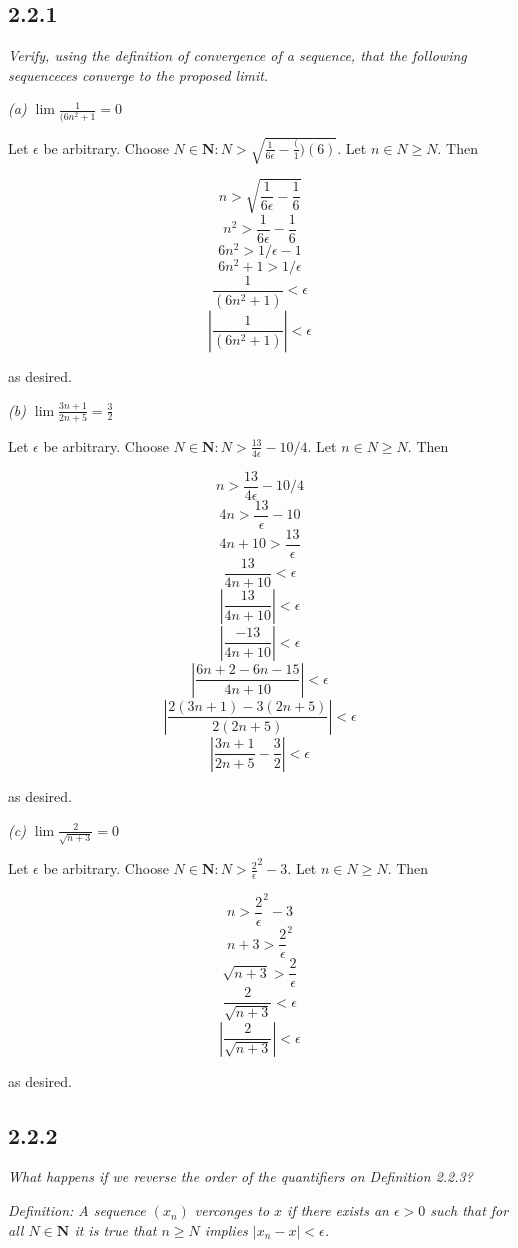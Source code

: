 \documentclass[11pt,oneside,titlepage]{book}
\begin{document}
\subsection*{2.2.1}
\textit{Verify, using the definition of convergence of a sequence, that the following
  sequenceces converge to the proposed limit.}

\textit{(a) $\lim\frac{1}{(6 n ^ 2 + 1} = 0$}

Let $\epsilon$ be arbitrary. Choose
$N \in \textbf{N}: N > \sqrt{\frac{1}{6 \epsilon} - \frac(1)(6)}$. Let $n \in N \geq N$. Then

$$n > \sqrt{\frac{1}{6 \epsilon} - \frac{1}{6}}$$
$$n ^ 2  > \frac{1}{6 \epsilon} - \frac{1}{6}$$
$$6 n ^ 2  > 1/\epsilon - 1$$
$$6 n ^ 2 + 1 > 1/\epsilon$$
$$\frac{1}{(6 n ^ 2 + 1)} < \epsilon$$
$$|\frac{1}{(6 n ^ 2 + 1)}| < \epsilon$$

as desired.

\textit{(b) $\lim\frac{3n + 1}{2n + 5} = \frac{3}{2}$}

Let $\epsilon$ be arbitrary. Choose
$N \in \textbf{N}: N > \frac{13}{4 \epsilon} - 10/4$. Let $n \in N \geq N$. Then

$$ n > \frac{13}{4 \epsilon} - 10/4$$
$$ 4n > \frac{13}{\epsilon} - 10$$
$$ 4n + 10 > \frac{13}{\epsilon} $$
$$ \frac{13}{4n + 10} < \epsilon $$
$$ |\frac{13}{4n + 10}| < \epsilon $$
$$ |\frac{-13}{4n + 10}| < \epsilon $$
$$ |\frac{6n + 2 - 6n - 15}{4n + 10}| < \epsilon $$
$$ |\frac{2(3n + 1) - 3(2n + 5)}{2(2n + 5)}| < \epsilon $$
$$ |\frac{3n + 1}{2n + 5} - \frac{3}{2}| < \epsilon $$

as desired.

\textit{(c) $\lim\frac{2}{\sqrt{n + 3}} = 0$}

Let $\epsilon$ be arbitrary. Choose
$N \in \textbf{N}: N > {\frac{2}{\epsilon}}^2 - 3$. Let $n \in N \geq N$. Then

$$n> {\frac{2}{\epsilon}}^2 - 3$$
$$n + 3 > {\frac{2}{\epsilon}}^2$$
$$\sqrt{n + 3} > \frac{2}{\epsilon}$$
$$\frac{2}{\sqrt{n + 3}} < \epsilon$$
$$|\frac{2}{\sqrt{n + 3}}| < \epsilon$$

as desired.

\subsection*{2.2.2}
\textit{What happens if we reverse the order of the quantifiers on Definition 2.2.3?}

\textit{Definition: A sequence $(x_n)$ verconges to $x$ if there exists an $\epsilon > 0$
  such that for all $N \in \textbf{N}$ it is true that $n \geq N$ implies $|x_n - x| <
  \epsilon$.}
\end{document}
